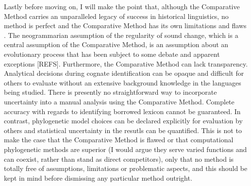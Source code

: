 Lastly before moving on, I will make the point that, although the Comparative Method carries an unparalleled legacy of success in historical linguistics, no method is perfect and the Comparative Method has its own limitations and flaws \autocite[see][]{durie_comparative_1996}. The neogrammarian assumption of the regularity of sound change, which is a central assumption of the Comparative Method, is an assumption about an evolutionary process that has been subject to some debate and apparent exceptions {[}REFS{]}. Furthermore, the Comparative Method can lack transparency. Analytical decisions during cognate identification can be opaque and difficult for others to evaluate without an extensive background knowledge in the languages being studied. There is presently no straightforward way to incorporate uncertainty into a manual analysis using the Comparative Method. Complete accuracy with regards to identifying borrowed lexicon cannot be guaranteed. In contrast, phylogenetic model choices can be declared explicitly for evaluation by others and statistical uncertainty in the resutls can be quantified. This is not to make the case that the Comparative Method is flawed or that computational phylogenetic methods are superior (I would argue they serve varied functions and can coexist, rather than stand as direct competitors), only that no method is totally free of assumptions, limitations or problematic aspects, and this should be kept in mind before dismissing any particular method outright.


